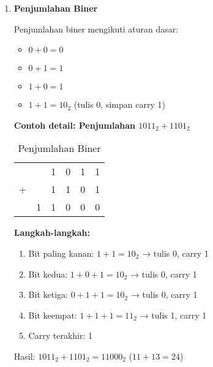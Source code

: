 \documentclass[../main.tex]{subfiles}
\begin{document}
            \begin{enumerate}
                \item \textbf{Penjumlahan Biner}

                    Penjumlahan biner mengikuti aturan dasar:
                    \begin{itemize}
                        \item \(0 + 0 = 0\)
                        \item \(0 + 1 = 1\)
                        \item \(1 + 0 = 1\)
                        \item \(1 + 1 = 10_2\) (tulis 0, simpan carry 1)
                    \end{itemize}

                    \textbf{Contoh detail: Penjumlahan \(1011_2 + 1101_2\)}

                    \begin{table}[H]
                        \centering
                        \caption{Penjumlahan Biner}
                        \begin{tabular}{cccccc}
                            &   & 1 & 0 & 1 & 1 \\
                            + &   & 1 & 1 & 0 & 1 \\
                            \hline
                            & 1 & 1 & 0 & 0 & 0 \\
                        \end{tabular}
                        \label{tab:binary-addition}
                    \end{table}

                    \textbf{Langkah-langkah:}
                    \begin{enumerate}
                        \item Bit paling kanan: \(1 + 1 = 10_2\) → tulis 0, carry 1
                        \item Bit kedua: \(1 + 0 + 1 = 10_2\) → tulis 0, carry 1
                        \item Bit ketiga: \(0 + 1 + 1 = 10_2\) → tulis 0, carry 1
                        \item Bit keempat: \(1 + 1 + 1 = 11_2\) → tulis 1, carry 1
                        \item Carry terakhir: 1
                    \end{enumerate}

                    Hasil: \(1011_2 + 1101_2 = 11000_2\) (\(11 + 13 = 24\))


\end{enumerate}
\end{document}
